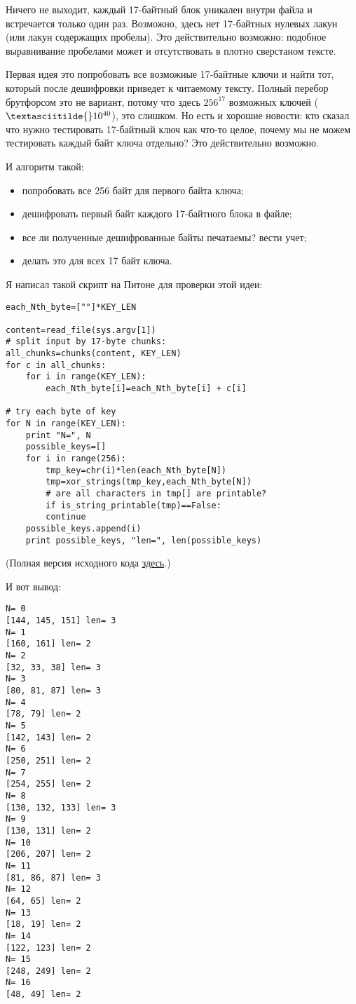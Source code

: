Ничего не выходит, каждый 17-байтный блок уникален внутри файла и встречается только один раз.
Возможно, здесь нет 17-байтных нулевых лакун (или лакун содержащих пробелы).
Это действительно возможно: подобное выравнивание пробелами может и отсутствовать в плотно сверстаном тексте.

Первая идея это попробовать все возможные 17-байтные ключи и найти тот, который после дешифровки приведет к читаемому тексту.
Полный перебор брутфорсом это не вариант, потому что здесь $256^{17}$ возможных ключей ($\textasciitilde{}10^{40}$),
это слишком.
Но есть и хорошие новости: кто сказал что нужно тестировать 17-байтный ключ как что-то целое, почему мы не можем тестировать
каждый байт ключа отдельно?
Это действительно возможно.

И алгоритм такой:

\begin{itemize}
\item попробовать все 256 байт для первого байта ключа;
\item дешифровать первый байт каждого 17-байтного блока в файле;
\item все ли полученные дешифрованные байты печатаемы? вести учет;
\item делать это для всех 17 байт ключа.
\end{itemize}

Я написал такой скрипт на Питоне для проверки этой идеи:

\begin{lstlisting}[caption=Python script,style=custompy]
each_Nth_byte=[""]*KEY_LEN

content=read_file(sys.argv[1])
# split input by 17-byte chunks:
all_chunks=chunks(content, KEY_LEN)
for c in all_chunks:
    for i in range(KEY_LEN):
        each_Nth_byte[i]=each_Nth_byte[i] + c[i]

# try each byte of key
for N in range(KEY_LEN):
    print "N=", N
    possible_keys=[]
    for i in range(256):
        tmp_key=chr(i)*len(each_Nth_byte[N])
        tmp=xor_strings(tmp_key,each_Nth_byte[N])
        # are all characters in tmp[] are printable?
        if is_string_printable(tmp)==False:
	    continue
	possible_keys.append(i)
    print possible_keys, "len=", len(possible_keys)
\end{lstlisting}

(Полная версия исходного кода \href{\RepoURL/ff/XOR/mask_2/files/decrypt2.py}{здесь}.)

И вот вывод:

\begin{lstlisting}
N= 0
[144, 145, 151] len= 3
N= 1
[160, 161] len= 2
N= 2
[32, 33, 38] len= 3
N= 3
[80, 81, 87] len= 3
N= 4
[78, 79] len= 2
N= 5
[142, 143] len= 2
N= 6
[250, 251] len= 2
N= 7
[254, 255] len= 2
N= 8
[130, 132, 133] len= 3
N= 9
[130, 131] len= 2
N= 10
[206, 207] len= 2
N= 11
[81, 86, 87] len= 3
N= 12
[64, 65] len= 2
N= 13
[18, 19] len= 2
N= 14
[122, 123] len= 2
N= 15
[248, 249] len= 2
N= 16
[48, 49] len= 2
\end{lstlisting}

